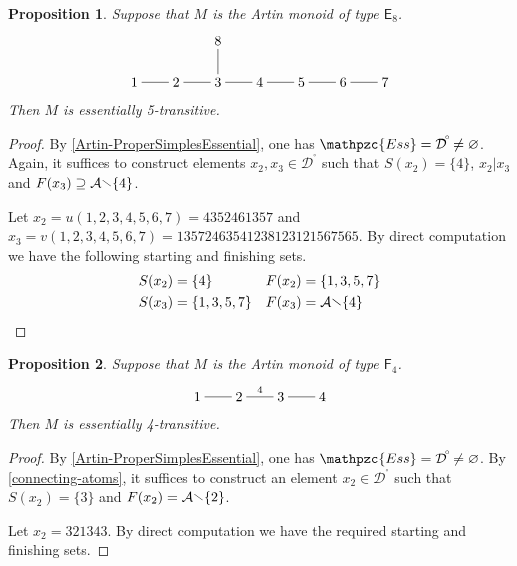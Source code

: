 \documentclass[a4paper,final]{article}
\let\emptyset\varnothing
\theoremstyle{plain}
\newtheorem{proposition}[proposition]{Proposition}
\theoremstyle{remark}
\theoremstyle{definition}
\begin{document}
\begin{proposition}
  Suppose that $M$ is the Artin monoid of type ${\mathsf{{E}}}_8$.
  \[
    \begin{xy}
      0;<3em,0em>:<0em,3em>::
      
      (0,0)*+{1}="1";
      (1,0)*+{2}="2";
      (2,0)*+{3}="3";
      (3,0)*+{4}="4";
      (4,0)*+{5}="5";
      (5,0)*+{6}="6";
      (6,0)*+{7}="7";
      (2,1)*+{8}="8";
      
      {\ar@{-}     "1";"2"};
      {\ar@{-}     "2";"3"};
      {\ar@{-}     "3";"4"};
      {\ar@{-}     "4";"5"};
      {\ar@{-}     "5";"6"};
      {\ar@{-}     "6";"7"};
      {\ar@{-}     "3";"8"};
    \end{xy}
  \]
  Then $M$ is essentially 5-transitive.
\end{proposition}
\begin{proof}
  By \autoref{Artin-ProperSimplesEssential}, one has ${\mathpzc{Ess}}={{\mathcal{D}}^{\!{}^{\circ}\!}}\neq\emptyset$.
  Again, it suffices to construct elements $x_2, x_3 \in {{\mathcal{D}}^{\!{}^{\circ}\!}}$
  such that ${S}(x_2) = \{4\}$, $x_2 | x_3$ and ${F}(x_3) \supseteq {\mathcal{A}}
  {\mathbin{\raisebox{0.25ex}{$\smallsetminus$}}} \{4\}$.

  Let $x_2 = u(1,2,3,4,5,6,7) = 4352461357$ and $x_3 =
  v(1,2,3,4,5,6,7) = 1357246354 1238123121 567565$.  By direct
  computation we have the following starting and finishing sets.
  \begin{align*}
    {S}(x_2) &= \{ 4 \} &
    {F}(x_2) &= \{ 1, 3, 5, 7 \} \\
    {S}(x_3) &= \{ 1, 3, 5, 7 \} &
    {F}(x_3) &= {\mathcal{A}}{\mathbin{\raisebox{0.25ex}{$\smallsetminus$}}}\{ 4 \}
  \end{align*}
\end{proof}

\begin{proposition}
  Suppose that $M$ is the Artin monoid of type ${\mathsf{{F}}}_4$.
  \[
    \begin{xy}
      0;<3em,0em>:<0em,3em>::
      
      (0,0)*+{1}="1";
      (1,0)*+{2}="2";
      (2,0)*+{3}="3";
      (3,0)*+{4}="4";
      
      {\ar@{-}     "1";"2"};
      {\ar@{-}^{4}  "2";"3"};
      {\ar@{-}     "3";"4"};
    \end{xy}
  \]
  Then $M$ is essentially 4-transitive.
\end{proposition}
\begin{proof}
  By \autoref{Artin-ProperSimplesEssential}, one has ${\mathpzc{Ess}}={{\mathcal{D}}^{\!{}^{\circ}\!}}\neq\emptyset$.
  By \autoref{connecting-atoms}, it suffices to construct an element
  $x_2 \in {{\mathcal{D}}^{\!{}^{\circ}\!}}$ such that ${S}(x_2) = \{3\}$ and ${F}(x_2) =
  {\mathcal{A}} {\mathbin{\raisebox{0.25ex}{$\smallsetminus$}}} \{2\}$.

  Let $x_2 = 321343$.  By direct computation we have
  the required starting and finishing sets.
\end{proof}
\end{document}
